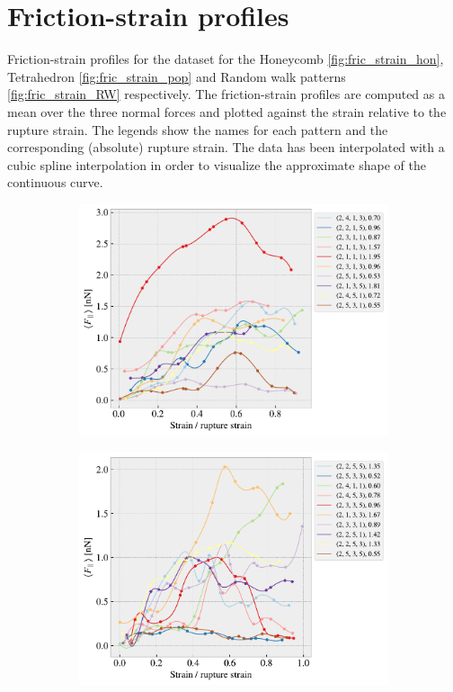 \chapter{Friction-strain profiles}\label{sec:data_stretch_profiles}
Friction-strain profiles for the dataset for the Honeycomb \cref{fig:fric_strain_hon}, Tetrahedron \cref{fig:fric_strain_pop} and Random walk patterns \cref{fig:fric_strain_RW} respectively. The friction-strain profiles are computed as a mean over the three normal forces and plotted against the strain relative to the rupture strain. The legends show the names for each pattern and the corresponding (absolute) rupture strain. The data has been interpolated with a cubic spline interpolation in order to visualize the approximate shape of the continuous curve.


\begin{figure}[H]
    \centering
    \begin{subfigure}[b]{0.49\textwidth}
        \centering
        \includegraphics[width=\textwidth]{figures/stretch_profiles/honeycomb/SP_0_honeycomb.pdf}
        \caption{}
    \end{subfigure}
    \hfill
    \begin{subfigure}[b]{0.49\textwidth}
        \centering
        \includegraphics[width=\textwidth]{figures/stretch_profiles/honeycomb/SP_1_honeycomb.pdf}

\end{subfigure}
\end{figure}
